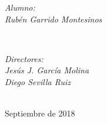 \documentclass[12pt,twoside,openany]{article}     %
\begin{document}
\begin{titlepage}
		
		\begin{minipage}{0.5\textwidth}
			\begin{flushleft} \large
				\emph{Alumno:}\\
				\emph{Rubén Garrido Montesinos}
			\end{flushleft}
		\end{minipage}
		~
		\begin{minipage}{0.45\textwidth}
			\begin{flushright} \large
				\emph{Directores:} \\
				\emph{Jesús J. García Molina}\\
				\emph{Diego Sevilla Ruiz}
			\end{flushright}
		\end{minipage}\\[1.5cm]
		
		
		
	
		
		
		
		
		{\large Septiembre de 2018}\\[1cm] %
		
	
		
		\vfill %
		
	\end{titlepage}
	

\end{document}
